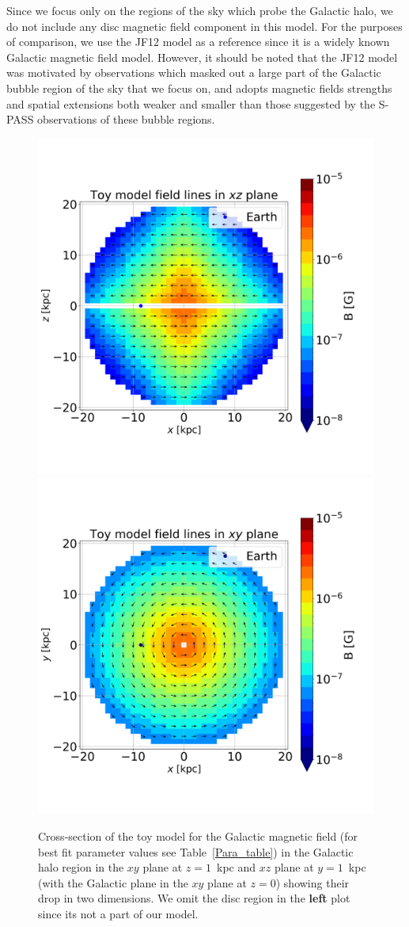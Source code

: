 \documentclass[usenatbib]{mnras}
\begin{document}
Since we focus only on the regions of the sky which probe the Galactic halo, we do not include any disc magnetic field component in this model. For the purposes of comparison, we use the JF12 model as a reference since it is a widely known Galactic magnetic field model.
However, it should be noted that the JF12 model was motivated by observations which masked out a large part of the Galactic bubble region of the sky that we focus on, and adopts magnetic fields strengths and spatial extensions both weaker and smaller than those suggested by the S-PASS observations \citep{Carretti_2013} of these bubble regions.

\begin{figure}
\centering
\includegraphics[width = 0.49\linewidth]{Images/ToyModel_BestFit_XZ.png}%
\includegraphics[width = 0.49\linewidth]{Images/ToyModel_BestFit_XY.png}
\caption{Cross-section of the toy model for the Galactic magnetic field (for best fit parameter values see Table~\ref{Para_table}) in the Galactic halo region in the $xy$ plane at $z = 1$~kpc and $xz$ plane at $y = 1$~kpc (with the Galactic plane in the $xy$ plane at $z=0$) showing their drop in two dimensions. We omit the disc region in the \textbf{left} plot since its not a part of our model.}
\label{fig:Vis_TM}
\end{figure}
\end{document}
